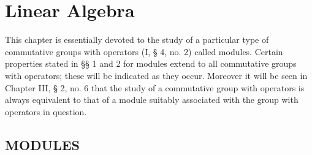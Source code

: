\chapter{Linear Algebra}

This chapter is essentially devoted to the study of a particular type of commutative groups with operators (I, § 4, no. 2) called modules. Certain properties stated in §§ 1 and 2 for modules extend to all commutative groups with operators; these will be indicated as they occur. Moreover it will be seen in Chapter III, § 2, no. 6 that the study of a commutative group with operators is always equivalent to that of a module suitably associated with the group with operators in question.

\section{MODULES}
